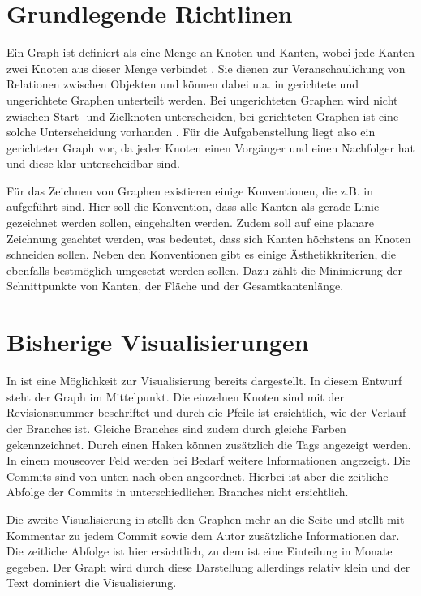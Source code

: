 \documentclass[color]{tudbook}
\begin{document}
\section{Grundlegende Richtlinen}
\label{sec:Richtlinien}
Ein Graph ist definiert als eine Menge an Knoten und Kanten, wobei jede Kanten zwei Knoten aus dieser Menge verbindet \cite[Seite 2]{Graphenoptimierung}. Sie dienen zur Veranschaulichung von Relationen zwischen Objekten und können dabei u.a. in gerichtete und ungerichtete Graphen unterteilt werden. Bei ungerichteten Graphen wird nicht zwischen Start- und Zielknoten unterscheiden, bei gerichteten Graphen ist eine solche Unterscheidung vorhanden \cite{diskreteMathematik}. Für die Aufgabenstellung liegt also ein gerichteter Graph vor, da jeder Knoten einen Vorgänger und einen Nachfolger hat und diese klar unterscheidbar sind.

Für das Zeichnen von Graphen existieren einige Konventionen, die z.B. in \cite{Aesthetik} aufgeführt sind. Hier soll die Konvention, dass alle Kanten als gerade Linie gezeichnet werden sollen, eingehalten werden. Zudem soll auf eine planare Zeichnung geachtet werden, was bedeutet, dass sich Kanten höchstens an Knoten schneiden sollen. Neben den Konventionen gibt es einige Ästhetikkriterien, die ebenfalls bestmöglich umgesetzt werden sollen. Dazu zählt die Minimierung der Schnittpunkte von Kanten, der Fläche und der Gesamtkantenlänge.

\section{Bisherige Visualisierungen}
In \cite{Gruppe2.1} ist eine Möglichkeit zur Visualisierung bereits dargestellt. In diesem Entwurf steht der Graph im Mittelpunkt. Die einzelnen Knoten sind mit der Revisionsnummer beschriftet und durch die Pfeile ist ersichtlich, wie der Verlauf der Branches ist. Gleiche Branches sind zudem durch gleiche Farben gekennzeichnet. Durch einen Haken können zusätzlich die Tags angezeigt werden. In einem mouseover Feld werden bei Bedarf weitere Informationen angezeigt. Die Commits sind von unten nach oben angeordnet. Hierbei ist aber die zeitliche Abfolge der Commits in unterschiedlichen Branches nicht ersichtlich.

Die zweite Visualisierung in \cite{Gruppe2.3} stellt den Graphen mehr an die Seite und stellt mit Kommentar zu jedem Commit sowie dem Autor zusätzliche Informationen dar. Die zeitliche Abfolge ist hier ersichtlich, zu dem ist eine Einteilung in Monate gegeben. Der Graph wird durch diese Darstellung allerdings relativ klein und der Text dominiert die Visualisierung.   
\end{document}
